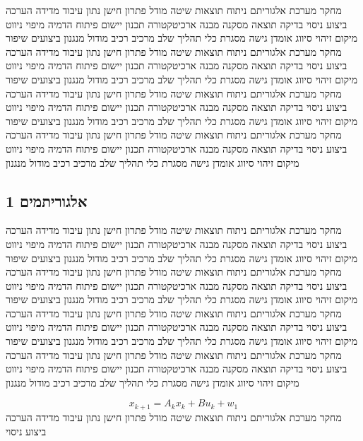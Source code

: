 מחקר מערכת אלגוריתם ניתוח תוצאות שיטה מודל פתרון חישן נתון עיבוד מדידה הערכה ביצוע ניסוי בדיקה תוצאה מסקנה מבנה ארכיטקטורה תכנון יישום פיתוח הדמיה מיפוי ניווט מיקום זיהוי סיווג אומדן גישה מסגרת כלי תהליך שלב מרכיב רכיב מודול מנגנון ביצועים שיפור מחקר מערכת אלגוריתם ניתוח תוצאות שיטה מודל פתרון חישן נתון עיבוד מדידה הערכה ביצוע ניסוי בדיקה תוצאה מסקנה מבנה ארכיטקטורה תכנון יישום פיתוח הדמיה מיפוי ניווט מיקום זיהוי סיווג אומדן גישה מסגרת כלי תהליך שלב מרכיב רכיב מודול מנגנון ביצועים שיפור מחקר מערכת אלגוריתם ניתוח תוצאות שיטה מודל פתרון חישן נתון עיבוד מדידה הערכה ביצוע ניסוי בדיקה תוצאה מסקנה מבנה ארכיטקטורה תכנון יישום פיתוח הדמיה מיפוי ניווט מיקום זיהוי סיווג אומדן גישה מסגרת כלי תהליך שלב מרכיב רכיב מודול מנגנון ביצועים שיפור מחקר מערכת אלגוריתם ניתוח תוצאות שיטה מודל פתרון חישן נתון עיבוד מדידה הערכה ביצוע ניסוי בדיקה תוצאה מסקנה מבנה ארכיטקטורה תכנון יישום פיתוח הדמיה מיפוי ניווט מיקום זיהוי סיווג אומדן גישה מסגרת כלי תהליך שלב מרכיב רכיב מודול מנגנון

\subsection{אלגוריתמים 1}
\label{sub:ch04_1}
מחקר מערכת אלגוריתם ניתוח תוצאות שיטה מודל פתרון חישן נתון עיבוד מדידה הערכה ביצוע ניסוי בדיקה תוצאה מסקנה מבנה ארכיטקטורה תכנון יישום פיתוח הדמיה מיפוי ניווט מיקום זיהוי סיווג אומדן גישה מסגרת כלי תהליך שלב מרכיב רכיב מודול מנגנון ביצועים שיפור מחקר מערכת אלגוריתם ניתוח תוצאות שיטה מודל פתרון חישן נתון עיבוד מדידה הערכה ביצוע ניסוי בדיקה תוצאה מסקנה מבנה ארכיטקטורה תכנון יישום פיתוח הדמיה מיפוי ניווט מיקום זיהוי סיווג אומדן גישה מסגרת כלי תהליך שלב מרכיב רכיב מודול מנגנון ביצועים שיפור מחקר מערכת אלגוריתם ניתוח תוצאות שיטה מודל פתרון חישן נתון עיבוד מדידה הערכה ביצוע ניסוי בדיקה תוצאה מסקנה מבנה ארכיטקטורה תכנון יישום פיתוח הדמיה מיפוי ניווט מיקום זיהוי סיווג אומדן גישה מסגרת כלי תהליך שלב מרכיב רכיב מודול מנגנון ביצועים שיפור מחקר מערכת אלגוריתם ניתוח תוצאות שיטה מודל פתרון חישן נתון עיבוד מדידה הערכה ביצוע ניסוי בדיקה תוצאה מסקנה מבנה ארכיטקטורה תכנון יישום פיתוח הדמיה מיפוי ניווט מיקום זיהוי סיווג אומדן גישה מסגרת כלי תהליך שלב מרכיב רכיב מודול מנגנון

\begin{equation}
    x_{k+1} = A_{k} x_k + B u_{k} + w_{1}
    \label{eq:ch04_1}
\end{equation}
מחקר מערכת אלגוריתם ניתוח תוצאות שיטה מודל פתרון חישן נתון עיבוד מדידה הערכה ביצוע ניסוי

